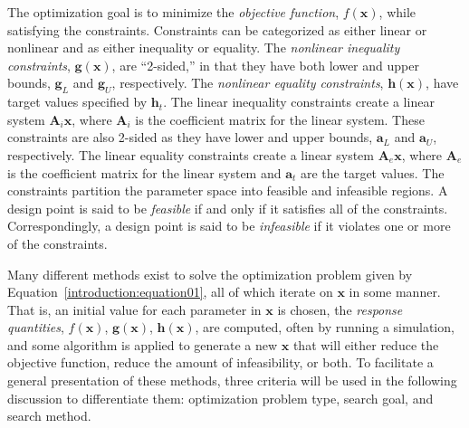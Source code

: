 The optimization goal is to minimize the \emph{objective function},
$f(\mathbf{x})$, while satisfying the constraints.  Constraints can be
categorized as either linear or nonlinear and as either inequality or
equality. The \emph{nonlinear inequality constraints},
$\mathbf{g(x)}$, are ``2-sided,'' in that they have both lower and
upper bounds, $\mathbf{g}_L$ and $\mathbf{g}_U$, respectively. The
\emph{nonlinear equality constraints}, $\mathbf{h(x)}$, have target
values specified by $\mathbf{h}_{t}$.  The linear inequality
constraints create a linear system $\mathbf{A}_i\mathbf{x}$, where
$\mathbf{A}_i$ is the coefficient matrix for the linear system.  These
constraints are also 2-sided as they have lower and upper bounds,
$\mathbf{a}_L$ and $\mathbf{a}_U$, respectively. The linear equality
constraints create a linear system $\mathbf{A}_e\mathbf{x}$, where
$\mathbf{A}_e$ is the coefficient matrix for the linear system and
$\mathbf{a}_{t}$ are the target values.  The constraints partition the
parameter space into feasible and infeasible regions. A design point
is said to be \emph{feasible} if and only if it satisfies all of the
constraints. Correspondingly, a design point is said to be
\emph{infeasible} if it violates one or more of the constraints.

Many different methods exist to solve the optimization problem given
by Equation~\ref{introduction:equation01}, all of which iterate on
$\mathbf{x}$ in some manner.  That is, an initial value for each
parameter in $\mathbf{x}$ is chosen, the \emph{response quantities},
$f(\mathbf{x})$, $\mathbf{g(x)}$, $\mathbf{h(x)}$, are computed, often
by running a simulation, and some algorithm is applied to generate a
new $\mathbf{x}$ that will either reduce the objective function,
reduce the amount of infeasibility, or both.  To facilitate a general
presentation of these methods, three criteria will be used in the
following discussion to differentiate them: optimization problem type,
search goal, and search method.

